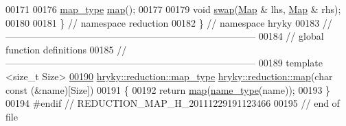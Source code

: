\begin{DoxyCode}
00171 
00176     \hyperlink{classhryky_1_1_intrusive_ptr}{map_type} \hyperlink{namespacehryky_1_1reduction_ac5eae270cf8047b294dc4ff3e5e11a79}{map}();
00177 
00179     \textcolor{keywordtype}{void} \hyperlink{namespacehryky_1_1reduction_a493c83efdf5f9e9c49ba77e1b65325a1}{swap}(\hyperlink{classhryky_1_1reduction_1_1_map}{Map} & lhs, \hyperlink{classhryky_1_1reduction_1_1_map}{Map} & rhs);
00180 
00181 \} \textcolor{comment}{// namespace reduction}
00182 \} \textcolor{comment}{// namespace hryky}
00183 \textcolor{comment}{//
      ------------------------------------------------------------------------------}
00184 \textcolor{comment}{// global function definitions}
00185 \textcolor{comment}{//
      ------------------------------------------------------------------------------}
00189 \textcolor{comment}{}\textcolor{keyword}{template} <\textcolor{keywordtype}{size\_t} Size>
\hypertarget{reduction__map_8h_source_l00190}{}\hyperlink{namespacehryky_1_1reduction_a8890878dbfd9285f3bcf01697eb33787}{00190} \hyperlink{classhryky_1_1_intrusive_ptr}{hryky::reduction::map_type} \hyperlink{namespacehryky_1_1reduction_ac5eae270cf8047b294dc4ff3e5e11a79}{hryky::reduction::map}(\textcolor{keywordtype}{char} \textcolor{keyword}{const} (&name)[Size])
00191 \{
00192     \textcolor{keywordflow}{return} \hyperlink{namespacehryky_1_1reduction_ac5eae270cf8047b294dc4ff3e5e11a79}{map}(\hyperlink{namespacehryky_1_1reduction_ac686c30a4c8d196bbd0f05629a6b921f}{name_type}(name));
00193 \}
00194 \textcolor{preprocessor}{#endif // REDUCTION\_MAP\_H\_20111229191123466}
00195 \textcolor{preprocessor}{}\textcolor{comment}{// end of file}
\end{DoxyCode}
